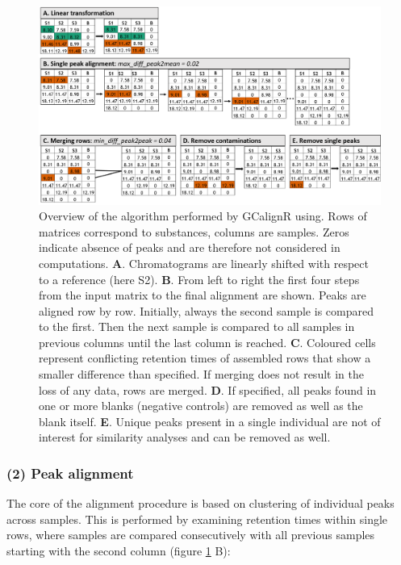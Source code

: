 \begin{figure}[htbp]
\centering
\includegraphics[width=13cm]{figures/algorithm_representation}
\caption{Overview of the algorithm performed by GCalignR using. Rows of matrices correspond to substances, columns are samples. Zeros indicate absence of peaks and are therefore not considered in computations. \textbf{A}. Chromatograms are linearly shifted with respect to a reference (here S2). \textbf{B}. From left to right the first four steps from the input matrix to the final alignment are shown. Peaks are aligned row by row. Initially, always the second sample is compared to the first. Then the next sample is compared to all samples in previous columns until the last column is reached. \textbf{C}. Coloured cells represent conflicting retention times of assembled rows that show a smaller difference than specified. If merging does not result in the loss of any data, rows are merged. \textbf{D}. If specified, all peaks found in one or more blanks (negative controls) are removed as well as the blank itself. \textbf{E}. Unique peaks present in a single individual are not of interest for similarity analyses and can be removed as well.}
\label{figure:algorithm}
\end{figure}

\subsubsection{(2) Peak alignment}\label{peak-alignment}

The core of the alignment procedure is based on clustering of individual
peaks across samples. This is performed by examining retention times
within single rows, where samples are compared consecutively with all
previous samples starting with the second column (figure
\ref{figure:algorithm} B):

